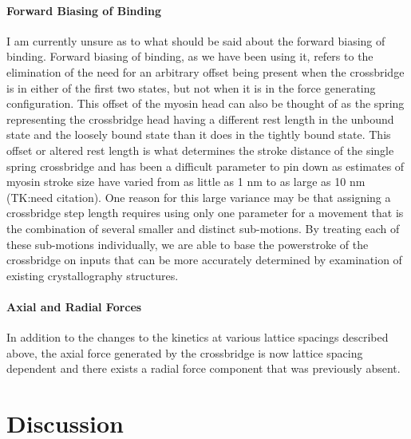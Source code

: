 \documentclass[]{article}
\begin{document}
\paragraph{Forward Biasing of Binding} %
I am currently unsure as to what should be said about the forward biasing of binding.
Forward biasing of binding, as we have been using it, refers to the elimination of the need for an arbitrary offset being present when the crossbridge is in either of the first two states, but not when it is in the force generating configuration.
This offset of the myosin head can also be thought of as the spring representing the crossbridge head having a different rest length in the unbound state and the loosely bound state than it does in the tightly bound state. 
This offset or altered rest length is what determines the stroke distance of the single spring crossbridge and has been a difficult parameter to pin down as estimates of myosin stroke size have varied from as little as 1 nm to as large as 10 nm (TK:need citation). 
One reason for this large variance may be that assigning a crossbridge step length requires using only one parameter for a movement that is the combination of several smaller and distinct sub-motions.
By treating each of these sub-motions individually, we are able to base the powerstroke of the crossbridge on inputs that can be more accurately determined by examination of existing crystallography structures.

\paragraph{Axial and Radial Forces} %
In addition to the changes to the kinetics at various lattice spacings described above, the axial force generated by the crossbridge is now lattice spacing dependent and there exists a radial force component that was previously absent.



\section{Discussion} %

\end{document}
